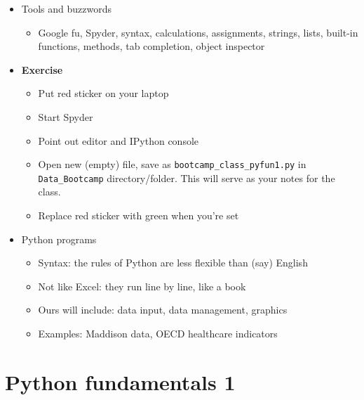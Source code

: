 \documentclass[11pt]{article}
\begin{document}
\begin{itemize}

\item Tools and buzzwords
\begin{itemize}
\item Google fu, Spyder, syntax, calculations, assignments, strings, lists, built-in functions, methods, tab completion, object inspector
\end{itemize}

\item {\bf Exercise}
\begin{itemize}
\item Put red sticker on your laptop
\item Start Spyder
\item Point out editor and IPython console
\item Open new (empty) file, save as \verb|bootcamp_class_pyfun1.py| in \verb|Data_Bootcamp| directory/folder.  This will serve as your notes for the class.
\item Replace red sticker with green when you're set
\end{itemize}


\item Python programs
\begin{itemize}
\item Syntax:  the rules of Python are less flexible than (say) English
\item Not like Excel: they run line by line, like a book
\item Ours will include:  data input, data management, graphics
\item Examples:  Maddison data, OECD healthcare indicators
\end{itemize}
\end{itemize}


\section*{Python fundamentals 1}
\end{document}
